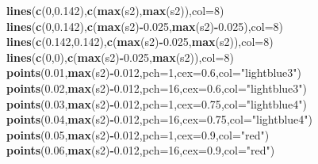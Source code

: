 \documentclass[]{article}
\newenvironment{Shaded}{\begin{snugshade}}{\end{snugshade}}
\newcommand{\DataTypeTok}[1]{\textcolor[rgb]{0.13,0.29,0.53}{#1}}
\newcommand{\DecValTok}[1]{\textcolor[rgb]{0.00,0.00,0.81}{#1}}
\newcommand{\FloatTok}[1]{\textcolor[rgb]{0.00,0.00,0.81}{#1}}
\newcommand{\KeywordTok}[1]{\textcolor[rgb]{0.13,0.29,0.53}{\textbf{#1}}}
\newcommand{\NormalTok}[1]{#1}
\newcommand{\OperatorTok}[1]{\textcolor[rgb]{0.81,0.36,0.00}{\textbf{#1}}}
\newcommand{\StringTok}[1]{\textcolor[rgb]{0.31,0.60,0.02}{#1}}
\begin{document}
\begin{Shaded}
\begin{Highlighting}[]
\KeywordTok{lines}\NormalTok{(}\KeywordTok{c}\NormalTok{(}\DecValTok{0}\NormalTok{,}\FloatTok{0.142}\NormalTok{),}\KeywordTok{c}\NormalTok{(}\KeywordTok{max}\NormalTok{(s2),}\KeywordTok{max}\NormalTok{(s2)),}\DataTypeTok{col=}\DecValTok{8}\NormalTok{)}
\KeywordTok{lines}\NormalTok{(}\KeywordTok{c}\NormalTok{(}\DecValTok{0}\NormalTok{,}\FloatTok{0.142}\NormalTok{),}\KeywordTok{c}\NormalTok{(}\KeywordTok{max}\NormalTok{(s2)}\OperatorTok{-}\FloatTok{0.025}\NormalTok{,}\KeywordTok{max}\NormalTok{(s2)}\OperatorTok{-}\FloatTok{0.025}\NormalTok{),}\DataTypeTok{col=}\DecValTok{8}\NormalTok{)}
\KeywordTok{lines}\NormalTok{(}\KeywordTok{c}\NormalTok{(}\FloatTok{0.142}\NormalTok{,}\FloatTok{0.142}\NormalTok{),}\KeywordTok{c}\NormalTok{(}\KeywordTok{max}\NormalTok{(s2)}\OperatorTok{-}\FloatTok{0.025}\NormalTok{,}\KeywordTok{max}\NormalTok{(s2)),}\DataTypeTok{col=}\DecValTok{8}\NormalTok{)}
\KeywordTok{lines}\NormalTok{(}\KeywordTok{c}\NormalTok{(}\DecValTok{0}\NormalTok{,}\DecValTok{0}\NormalTok{),}\KeywordTok{c}\NormalTok{(}\KeywordTok{max}\NormalTok{(s2)}\OperatorTok{-}\FloatTok{0.025}\NormalTok{,}\KeywordTok{max}\NormalTok{(s2)),}\DataTypeTok{col=}\DecValTok{8}\NormalTok{)}
\KeywordTok{points}\NormalTok{(}\FloatTok{0.01}\NormalTok{,}\KeywordTok{max}\NormalTok{(s2)}\OperatorTok{-}\FloatTok{0.012}\NormalTok{,}\DataTypeTok{pch=}\DecValTok{1}\NormalTok{,}\DataTypeTok{cex=}\FloatTok{0.6}\NormalTok{,}\DataTypeTok{col=}\StringTok{"lightblue3"}\NormalTok{)}
\KeywordTok{points}\NormalTok{(}\FloatTok{0.02}\NormalTok{,}\KeywordTok{max}\NormalTok{(s2)}\OperatorTok{-}\FloatTok{0.012}\NormalTok{,}\DataTypeTok{pch=}\DecValTok{16}\NormalTok{,}\DataTypeTok{cex=}\FloatTok{0.6}\NormalTok{,}\DataTypeTok{col=}\StringTok{"lightblue3"}\NormalTok{)}
\KeywordTok{points}\NormalTok{(}\FloatTok{0.03}\NormalTok{,}\KeywordTok{max}\NormalTok{(s2)}\OperatorTok{-}\FloatTok{0.012}\NormalTok{,}\DataTypeTok{pch=}\DecValTok{1}\NormalTok{,}\DataTypeTok{cex=}\FloatTok{0.75}\NormalTok{,}\DataTypeTok{col=}\StringTok{"lightblue4"}\NormalTok{)}
\KeywordTok{points}\NormalTok{(}\FloatTok{0.04}\NormalTok{,}\KeywordTok{max}\NormalTok{(s2)}\OperatorTok{-}\FloatTok{0.012}\NormalTok{,}\DataTypeTok{pch=}\DecValTok{16}\NormalTok{,}\DataTypeTok{cex=}\FloatTok{0.75}\NormalTok{,}\DataTypeTok{col=}\StringTok{"lightblue4"}\NormalTok{)}
\KeywordTok{points}\NormalTok{(}\FloatTok{0.05}\NormalTok{,}\KeywordTok{max}\NormalTok{(s2)}\OperatorTok{-}\FloatTok{0.012}\NormalTok{,}\DataTypeTok{pch=}\DecValTok{1}\NormalTok{,}\DataTypeTok{cex=}\FloatTok{0.9}\NormalTok{,}\DataTypeTok{col=}\StringTok{"red"}\NormalTok{)}
\KeywordTok{points}\NormalTok{(}\FloatTok{0.06}\NormalTok{,}\KeywordTok{max}\NormalTok{(s2)}\OperatorTok{-}\FloatTok{0.012}\NormalTok{,}\DataTypeTok{pch=}\DecValTok{16}\NormalTok{,}\DataTypeTok{cex=}\FloatTok{0.9}\NormalTok{,}\DataTypeTok{col=}\StringTok{"red"}\NormalTok{)}


\end{Highlighting}
\end{Shaded}
\end{document}

